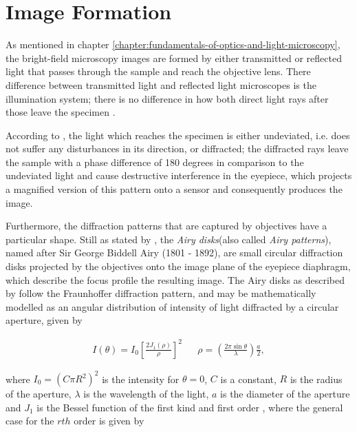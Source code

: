 \section{Image Formation}

As mentioned in chapter \ref{chapter:fundamentals-of-optics-and-light-microscopy}, the bright-field microscopy images are formed by either transmitted or reflected light that passes through the sample and reach the objective lens. There difference between transmitted light and reflected light microscopes is the illumination system; there is no difference in how both direct light rays after those leave the specimen \cite{leng2009materials}.

According to , the light which reaches the specimen is either undeviated, i.e. does not suffer any disturbances in its direction, or diffracted; the diffracted rays leave the sample with a phase difference of 180 degrees in comparison to the undeviated light and cause destructive interference in the eyepiece, which projects a magnified version of this pattern onto a sensor and consequently produces the image.

Furthermore, the diffraction patterns that are captured by objectives have a particular shape. Still as stated by , the \emph{Airy disks}(also called \emph{Airy patterns}), named after Sir George Biddell Airy (1801 - 1892), are small circular diffraction disks projected by the objectives onto the image plane of the eyepiece diaphragm, which describe the focus profile the resulting image. The Airy disks as described by  follow the Fraunhoffer diffraction pattern, and may be mathematically modelled as an angular distribution of intensity of light diffracted by a circular aperture, given by

\begin{align}
\label{eqn:airy_function}
I(\theta) = I_{0} 
            \left[ 
            \frac{2 J_{1} (\rho)}{\rho}
            \right]^{2}
&&
\rho = \left( 
        \frac{2 \pi \sin{\theta}}{\lambda}
        \right) \frac{a}{2},
\end{align}

\noindent where $I_{0} = (C \pi R^{2})^{2}$ is the intensity for $\theta = 0$, $C$ is a constant, $R$ is the radius of the aperture, $\lambda$ is the wavelength of the light, $a$ is the diameter of the aperture and $J_{1}$ is the Bessel function of the first kind and first order \cite{mathews1970mathematical}, where the general case for the $rth$ order is given by

